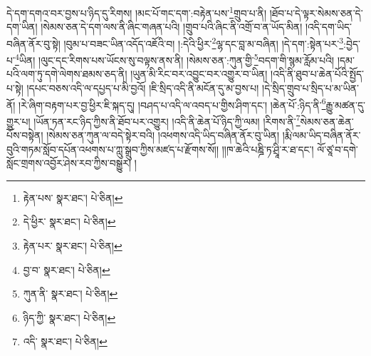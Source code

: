 དེ་དག་དགའ་བར་བྱས་པ་ཉིད་དུ་རིགས། །མང་པོ་གང་དག་:བརྟེན་པས་\footnote{རྟེན་པས་  སྣར་ཐང་།  པེ་ཅིན། }གྲུབ་པ་ནི། །ཐོབ་པ་དེ་ལྟར་སེམས་ཅན་དེ་དག་ཡིན། །སེམས་ཅན་དེ་དག་ལས་ནི་ཞིང་གཞན་པའི། །གྲུབ་པའི་ཞིང་ནི་འགྲོ་བ་ན་ཡོད་མིན། །འདི་དག་ཡིད་བཞིན་ནོར་བུ་སྟེ། །བུམ་པ་བཟང་ཡིན་འདོད་འཇོའི་བ། །:དེའི་ཕྱིར་\footnote{དེ་ཕྱིར་  སྣར་ཐང་།  པེ་ཅིན། }ལྷ་དང་བླ་མ་བཞིན། །དེ་དག་:སྟེན་པར་\footnote{རྟེན་པར་  སྣར་ཐང་།  པེ་ཅིན། }:བྱེད་པ་\footnote{བྱ་བ་  སྣར་ཐང་།  པེ་ཅིན། }ཡིན། །ལུང་དང་རིགས་པས་ཡོངས་སུ་བལྟས་ནས་ནི། །སེམས་ཅན་:ཀུན་གྱི་\footnote{ཀུན་ནི་  སྣར་ཐང་།  པེ་ཅིན། }བདག་གི་སྙམ་རློམ་པའི། །དམ་པའི་ལག་ཏུ་དགེ་ལེགས་ཐམས་ཅད་ནི། །ཡུན་མི་རིང་བར་འབྱུང་བར་འགྱུར་བ་ཡིན། །འདི་ནི་ཐུབ་པ་ཆེན་པོའི་སྤྱོད་པ་སྟེ། །དཔང་བཅས་འདི་ལ་དཔྱད་པ་མི་བྱའོ། །ཇི་སྲིད་འདི་ནི་མངོན་དུ་མ་བྱས་པ། །དེ་སྲིད་གྲུབ་པ་སྲིད་པ་མ་ཡིན་ནོ། །རེ་ཞིག་བརྟག་པར་བྱ་ཕྱིར་ཇི་སྐད་དུ། །བཤད་པ་འདི་ལ་འབད་པ་གྱིས་ཤིག་དང་། །ཆེན་པོ་:ཉིད་ནི་\footnote{ཉིད་ཀྱི་  སྣར་ཐང་།  པེ་ཅིན། }རྒྱུ་མཚན་དུ་གྱུར་པ། །ཡོན་ཏན་རང་ཉིད་ཀྱིས་ནི་ཐོབ་པར་འགྱུར། །འདི་ནི་ཆེན་པོ་ཉིད་ཀྱི་ལམ། །རིགས་ནི་\footnote{འདི་  སྣར་ཐང་།  པེ་ཅིན། }སེམས་ཅན་ཆེན་པོས་བསྟེན། །སེམས་ཅན་ཀུན་ལ་བདེ་སྟེར་བའི། །འཕགས་འདི་ཡིད་བཞིན་ནོར་བུ་ཡིན། །རྨི་ལམ་ཡིད་བཞིན་ནོར་བུའི་གཏམ་སློབ་དཔོན་འཕགས་པ་ཀླུ་སྒྲུབ་ཀྱིས་མཛད་པ་རྫོགས་སོ།། །།ཁ་ཆེའི་པཎྜི་ཏ་ཤྲཱི་ར་ཐ་དང་། ལོ་ཙཱ་བ་དགེ་སློང་གྲགས་འབྱོར་ཤེས་རབ་ཀྱིས་བསྒྱུར། ། 